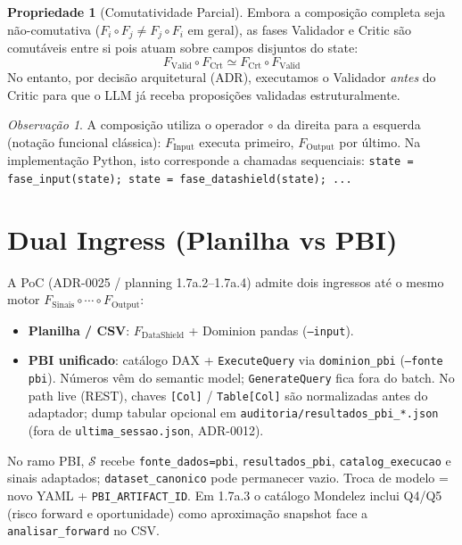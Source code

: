 \documentclass[a4paper, 12pt]{report}
\theoremstyle{definition}
\newtheorem{propriedade}{Propriedade}[chapter]
\theoremstyle{remark}
\newtheorem{observacao}{Observa\c{c}\~ao}[chapter]
\newcommand{\state}{\mathcal{S}}
\begin{document}
\begin{propriedade}[Comutatividade Parcial]
  Embora a composi\c{c}\~ao completa seja n\~ao-comutativa ($F_i \circ F_j \neq F_j \circ F_i$ em geral),
  as fases Validador e Critic s\~ao comut\'aveis entre si pois atuam sobre
  campos disjuntos do state:
  \[
    F_{\text{Valid}} \circ F_{\text{Crt}} \simeq F_{\text{Crt}} \circ F_{\text{Valid}}
  \]
  No entanto, por decis\~ao arquitetural (ADR), executamos o Validador
  \textit{antes} do Critic para que o LLM j\'a receba proposi\c{c}\~oes
  validadas estruturalmente.
\end{propriedade}

\begin{observacao}
  A composi\c{c}\~ao utiliza o operador $\circ$ da direita para a esquerda
  (nota\c{c}\~ao funcional cl\'assica): $F_{\text{Input}}$ executa primeiro,
  $F_{\text{Output}}$ por \'ultimo. Na implementa\c{c}\~ao Python, isto
  corresponde a chamadas sequenciais:
  \texttt{state = fase\_input(state); state = fase\_datashield(state); ...}
\end{observacao}

\section{Dual Ingress (Planilha vs PBI)}

A PoC (ADR-0025 / planning 1.7a.2--1.7a.4) admite dois ingressos at\'e o mesmo
motor $F_{\text{Sinais}}\circ\cdots\circ F_{\text{Output}}$:

\begin{itemize}
  \item \textbf{Planilha / CSV}: $F_{\text{DataShield}}$ + Dominion
    pandas (\texttt{--input}).
  \item \textbf{PBI unificado}: cat\'alogo DAX + \texttt{ExecuteQuery}
    via \texttt{dominion\_pbi} (\texttt{--fonte pbi}). N\'umeros v\^em do
    semantic model; \texttt{GenerateQuery} fica fora do batch.
    No path live (REST), chaves \texttt{[Col]} / \texttt{Table[Col]}
    s\~ao normalizadas antes do adaptador; dump tabular opcional em
    \texttt{auditoria/resultados\_pbi\_*.json} (fora de
    \texttt{ultima\_sessao.json}, ADR-0012).
\end{itemize}

No ramo PBI, $\state$ recebe \texttt{fonte\_dados=pbi},
\texttt{resultados\_pbi}, \texttt{catalog\_execucao} e sinais adaptados;
\texttt{dataset\_canonico} pode permanecer vazio. Troca de modelo =
novo YAML + \texttt{PBI\_ARTIFACT\_ID}. Em 1.7a.3 o cat\'alogo Mondelez
inclui Q4/Q5 (risco forward e oportunidade) como aproxima\c{c}\~ao
snapshot face a \texttt{analisar\_forward} no CSV.
\end{document}

